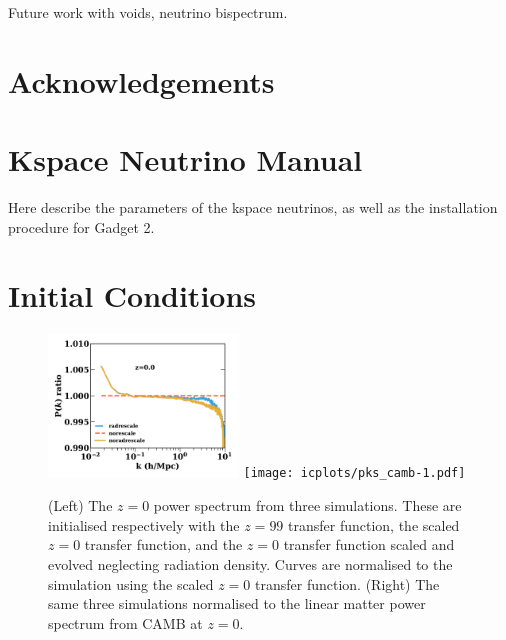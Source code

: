 \documentclass[useAMS, usenatbib]{mnras}
\begin{document}
Future work with voids, neutrino bispectrum.

\section*{Acknowledgements}

\appendix

\section{Kspace Neutrino Manual}
\label{sec:manual}

Here describe the parameters of the kspace neutrinos,
as well as the installation procedure for Gadget 2.

\section{Initial Conditions}
\label{sec:initcond}

\begin{figure}
\includegraphics[width=0.45\textwidth]{icplots/pks_rel-1.pdf}
\texttt{[image: icplots/pks\_camb-1.pdf]}
  \caption{(Left) The $z=0$ power spectrum from three simulations.
  These are initialised respectively with the $z=99$ transfer function,
  the scaled $z=0$ transfer function, and the $z=0$ transfer function
  scaled and evolved neglecting radiation density.
  Curves are normalised to the simulation using the scaled $z=0$ transfer function.
  (Right) The same three simulations normalised to the linear matter
  power spectrum from CAMB at $z=0$.}
  \label{fig:rescaling0}
\end{figure}
\end{document}

